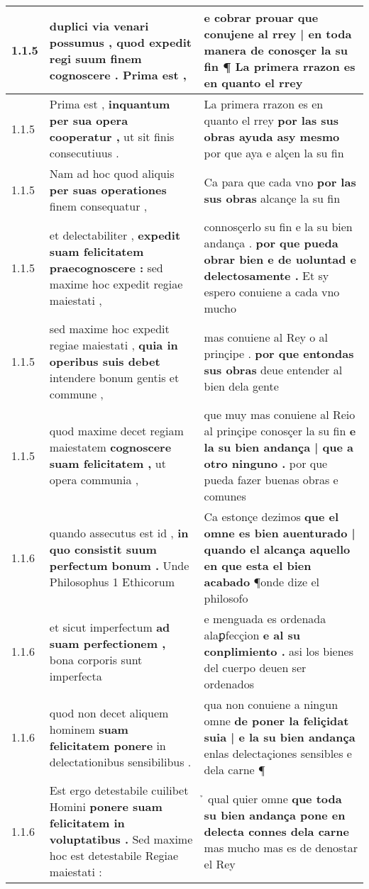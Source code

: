 \begin{tabular}{|p{1cm}|p{6.5cm}|p{6.5cm}|}
1.1.5 & duplici via venari possumus , \textbf{ quod expedit regi suum finem cognoscere . } Prima est , & e cobrar prouar \textbf{ que conujene al rrey | en toda manera de conosçer la su fin ¶ } La primera rrazon es en quanto el rrey \\\hline
1.1.5 & Prima est , \textbf{ inquantum per sua opera cooperatur , } ut sit finis consecutiuus . & La primera rrazon es en quanto el rrey \textbf{ por las sus obras ayuda asy mesmo } por que aya e alçen la su fin \\\hline
1.1.5 & Nam ad hoc quod aliquis \textbf{ per suas operationes } finem consequatur , & Ca para que cada vno \textbf{ por las sus obras } alcançe la su fin \\\hline
1.1.5 & et delectabiliter , \textbf{ expedit suam felicitatem praecognoscere : } sed maxime hoc expedit regiae maiestati , & connosçerlo su fin e la su bien andança . \textbf{ por que pueda obrar bien e de uoluntad e delectosamente . } Et sy espero conuiene a cada vno mucho \\\hline
1.1.5 & sed maxime hoc expedit regiae maiestati , \textbf{ quia in operibus suis debet } intendere bonum gentis et commune , & mas conuiene al Rey o al prinçipe . \textbf{ por que entondas sus obras } deue entender al bien dela gente \\\hline
1.1.5 & quod maxime decet regiam maiestatem \textbf{ cognoscere suam felicitatem , } ut opera communia , & que muy mas conuiene al Reio al prinçipe conosçer la su fin \textbf{ e la su bien andança | que a otro ninguno . } por que pueda fazer buenas obras e comunes \\\hline
1.1.6 & quando assecutus est id , \textbf{ in quo consistit suum perfectum bonum . } Unde Philosophus 1 Ethicorum & Ca estonçe dezimos \textbf{ que el omne es bien auenturado | quando el alcança aquello en que esta el bien acabado } ¶onde dize el philosofo \\\hline
1.1.6 & et sicut imperfectum \textbf{ ad suam perfectionem , } bona corporis sunt imperfecta & e menguada es ordenada alaꝑfecçion \textbf{ e al su conplimiento . } asi los bienes del cuerpo deuen ser ordenados \\\hline
1.1.6 & quod non decet aliquem hominem \textbf{ suam felicitatem ponere } in delectationibus sensibilibus . & qua non conuiene a ningun omne \textbf{ de poner la feliçidat suia | e la su bien andança } enlas delectaçiones sensibles e dela carne ¶ \\\hline
1.1.6 & Est ergo detestabile cuilibet Homini \textbf{ ponere suam felicitatem in voluptatibus . } Sed maxime hoc est detestabile Regiae maiestati : & ̉ qual quier omne \textbf{ que toda su bien andança pone en delecta connes dela carne } mas mucho mas es de denostar el Rey \\\hline

\end{tabular}
